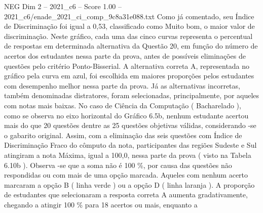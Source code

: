 \begin{textsample}{NEG Dim 2 – 2021\_c6 – Score 1.00 – 2021\_c6/enade\_2021\_ci\_comp\_9c8a31e088.txt}
Como já comentado, seu Índice de Discriminação foi igual a 0,53, classificado como Muito bom, o maior valor de discriminação.
Neste gráfico, cada uma das cinco curvas representa o percentual de respostas em determinada alternativa da Questão 20, em função do número de acertos dos estudantes nessa parte da prova, antes de possíveis eliminações de questões pelo critério Ponto-Bisserial.
A alternativa correta A, representada no gráfico pela curva em azul, foi escolhida em maiores proporções pelos estudantes com desempenho melhor nessa parte da prova.
Já as alternativas incorretas, também denominadas distratores, foram selecionadas, principalmente, por aqueles com notas mais baixas.
No caso de Ciência da Computação ( Bacharelado ), como se observa no eixo horizontal do Gráfico 6.5b, nenhum estudante acertou mais do que 20 questões dentre as 25 questões objetivas válidas, considerando -se o gabarito original.
Assim, com a eliminação das seis questões com Índice de Discriminação Fraco do cômputo da nota, participantes das regiões Sudeste e Sul atingiram a nota Máxima, igual a 100,0, nessa parte da prova ( visto na Tabela 6.10b ).
Observa -se que a soma não é 100 \%, por causa das questões não respondidas ou com mais de uma opção marcada.
Aqueles com nenhum acerto marcaram a opção B ( linha verde ) ou a opção D ( linha laranja ).
A proporção de estudantes que selecionaram a resposta correta A aumenta gradativamente, chegando a atingir 100 \% para 18 acertos ou mais, enquanto a

\end{textsample}
